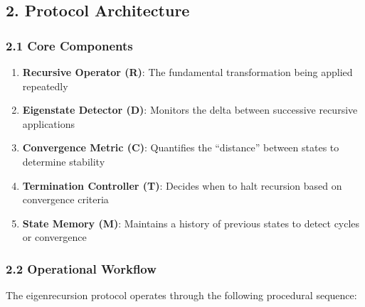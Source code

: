 \documentclass[
]{article}
\providecommand{\tightlist}{%
  \setlength{\itemsep}{0pt}\setlength{\parskip}{0pt}}
\begin{document}
\subsection{2. Protocol Architecture}\label{protocol-architecture}

\subsubsection{2.1 Core Components}\label{core-components}

\begin{enumerate}
\def\labelenumi{\arabic{enumi}.}
\tightlist
\item
  \textbf{Recursive Operator (R)}: The fundamental transformation being
  applied repeatedly
\item
  \textbf{Eigenstate Detector (D)}: Monitors the delta between
  successive recursive applications
\item
  \textbf{Convergence Metric (C)}: Quantifies the ``distance'' between
  states to determine stability
\item
  \textbf{Termination Controller (T)}: Decides when to halt recursion
  based on convergence criteria
\item
  \textbf{State Memory (M)}: Maintains a history of previous states to
  detect cycles or convergence
\end{enumerate}

\subsubsection{2.2 Operational Workflow}\label{operational-workflow}

The eigenrecursion protocol operates through the following procedural
sequence:
\end{document}
